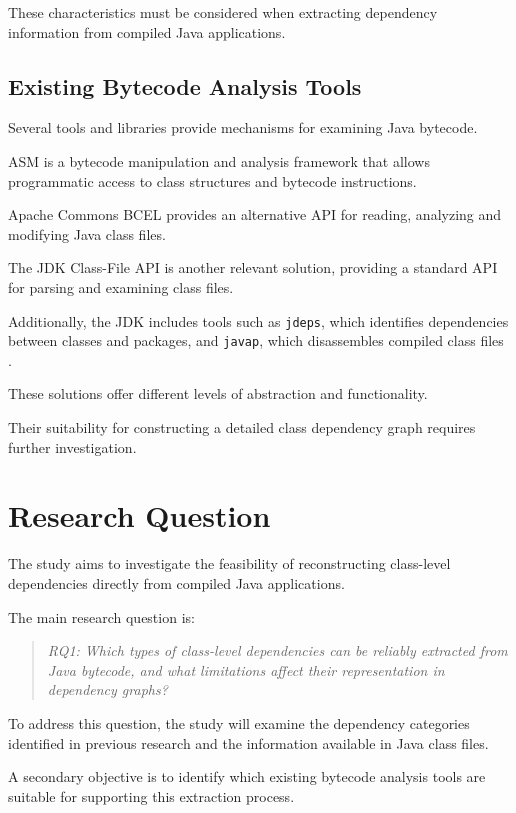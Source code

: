 \documentclass[conference]{IEEEtran}
\begin{document}
	These characteristics must be considered
	when extracting dependency information
	from compiled Java applications.
	
	\subsection{Existing Bytecode Analysis Tools}
	
	Several tools and libraries provide
	mechanisms for examining Java bytecode.
	
	ASM \cite{b4} is a bytecode manipulation
	and analysis framework that allows
	programmatic access to class structures
	and bytecode instructions.
	
	Apache Commons BCEL \cite{b5} provides
	an alternative API for reading, analyzing
	and modifying Java class files.
	
	The JDK Class-File API \cite{b6} is
	another relevant solution, providing
	a standard API for parsing and examining
	class files.
	
	Additionally, the JDK includes tools
	such as \texttt{jdeps}, which identifies
	dependencies between classes and packages,
	and \texttt{javap}, which disassembles
	compiled class files \cite{b7,b8}.
	
	These solutions offer different levels
	of abstraction and functionality.
	
	Their suitability for constructing a
	detailed class dependency graph requires
	further investigation.
	
	
	\section{Research Question}
	
	The study aims to investigate the
	feasibility of reconstructing class-level
	dependencies directly from compiled Java
	applications.
	
	The main research question is:
	
	\begin{quote}
		\textit{RQ1: Which types of class-level
			dependencies can be reliably extracted
			from Java bytecode, and what limitations
			affect their representation in
			dependency graphs?}
	\end{quote}
	
	To address this question, the study
	will examine the dependency categories
	identified in previous research and
	the information available in Java
	class files.
	
	A secondary objective is to identify
	which existing bytecode analysis tools
	are suitable for supporting this
	extraction process.
	
\end{document}
